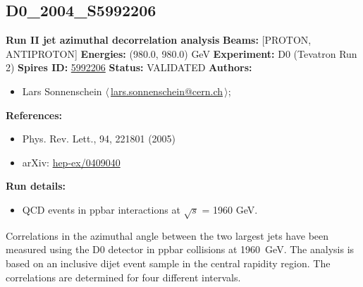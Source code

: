 \subsection[D0\_2004\_S5992206]{D0\_2004\_S5992206\,\cite{Abazov:2004hm}}
\textbf{Run II jet azimuthal decorrelation analysis}\newline
\textbf{Beams:} [PROTON, ANTIPROTON] \newline
\textbf{Energies:} (980.0, 980.0) GeV \newline
\textbf{Experiment:} D0 (Tevatron Run 2) \newline
\textbf{Spires ID:} \href{http://www.slac.stanford.edu/spires/find/hep/www?rawcmd=key+5992206}{5992206}\newline
\textbf{Status:} VALIDATED\newline
\textbf{Authors:}
\begin{itemize}
  \item Lars Sonnenschein $\langle\,$\href{mailto:lars.sonnenschein@cern.ch}{lars.sonnenschein@cern.ch}$\,\rangle$;
\end{itemize}
\textbf{References:}
\begin{itemize}
  \item Phys. Rev. Lett., 94, 221801 (2005)
  \item arXiv: \href{http://arxiv.org/abs/hep-ex/0409040}{hep-ex/0409040}
\end{itemize}
\textbf{Run details:}
\begin{itemize}

  \item QCD events in ppbar interactions at \ensuremath{\sqrt{s}} = 1960 GeV.\end{itemize}

\noindent Correlations in the azimuthal angle between the two largest \pT jets have been measured using the D0 detector in ppbar collisions at 1960~GeV. The analysis is based on an inclusive dijet event sample in the central rapidity region. The correlations are determined for four different \pT intervals.

\clearpage


\clearpage

